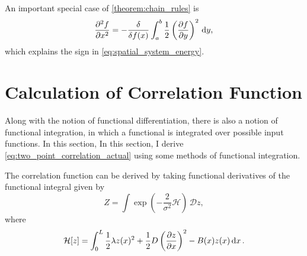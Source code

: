An important special case of \cref{theorem:chain_rules} is
\begin{equation}
  \label{eq:derivative_of_squared_derivative}
  \pdv[2]{f}{x} = -\fdv{f(x)}\int_a^b \frac{1}{2}\left(\pdv{f}{y}\right)^2\,\mathrm{d}y,
\end{equation}
which explains the sign in \cref{eq:spatial_system_energy}.

\section{Calculation of Correlation Function}
\label{sec:evaluation_of_integral}
Along with the notion of functional differentiation, there is also a notion of functional integration, in which a functional is integrated over
possible input functions. In this section,  In this section, I derive \cref{eq:two_point_correlation_actual} using some methods of functional integration.

The correlation function can be derived by taking functional derivatives of the functional integral given by
 \begin{equation}
   \label{eq:path_integral}
   Z = \int \exp\left( -\frac{2}{\sigma^2} \mathcal{H} \right) \, \mathcal{D}z,
 \end{equation}
 where
 \begin{equation}
   \label{eq:hamiltonian}
   \mathcal{H}[z] = \int_0^L \frac{1}{2}\lambda z(x)^2 + \frac{1}{2}D\left(\pdv{z}{x}\right)^2 - B(x)z(x)\dd{x}.
 \end{equation}


